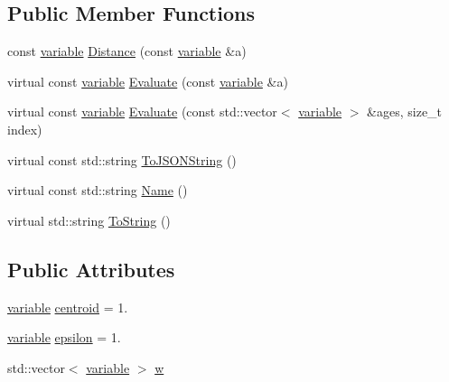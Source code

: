 \subsection*{Public Member Functions}
\begin{DoxyCompactItemize}
\item 
const \hyperlink{structmas_1_1_inverse_quadratic_r_b_f_aa73b147b14646342ba3141b53752cb1b}{variable} \hyperlink{structmas_1_1_inverse_quadratic_r_b_f_a56cc3b331603a6e1df6b861d827bed79}{Distance} (const \hyperlink{structmas_1_1_inverse_quadratic_r_b_f_aa73b147b14646342ba3141b53752cb1b}{variable} \&a)
\item 
virtual const \hyperlink{structmas_1_1_inverse_quadratic_r_b_f_aa73b147b14646342ba3141b53752cb1b}{variable} \hyperlink{structmas_1_1_inverse_quadratic_r_b_f_a4753edb34b33f783ae2c645cc16a607c}{Evaluate} (const \hyperlink{structmas_1_1_inverse_quadratic_r_b_f_aa73b147b14646342ba3141b53752cb1b}{variable} \&a)
\item 
virtual const \hyperlink{structmas_1_1_inverse_quadratic_r_b_f_aa73b147b14646342ba3141b53752cb1b}{variable} \hyperlink{structmas_1_1_inverse_quadratic_r_b_f_a326a1c19949fa3b309fbfc38a4c85dc7}{Evaluate} (const std\-::vector$<$ \hyperlink{structmas_1_1_inverse_quadratic_r_b_f_aa73b147b14646342ba3141b53752cb1b}{variable} $>$ \&ages, size\-\_\-t index)
\item 
virtual const std\-::string \hyperlink{structmas_1_1_inverse_quadratic_r_b_f_a59195ed8bba6ab30d34fa1d204c264bf}{To\-J\-S\-O\-N\-String} ()
\item 
virtual const std\-::string \hyperlink{structmas_1_1_inverse_quadratic_r_b_f_a2733866b50a4a7ae667f50334fdccc27}{Name} ()
\item 
virtual std\-::string \hyperlink{structmas_1_1_inverse_quadratic_r_b_f_a51999c40500b4bedc5bb24a1b0b87bb7}{To\-String} ()
\end{DoxyCompactItemize}
\subsection*{Public Attributes}
\begin{DoxyCompactItemize}
\item 
\hyperlink{structmas_1_1_inverse_quadratic_r_b_f_aa73b147b14646342ba3141b53752cb1b}{variable} \hyperlink{structmas_1_1_inverse_quadratic_r_b_f_a38cd5584cc6b9204720c0d8263095984}{centroid} = 1.
\item 
\hyperlink{structmas_1_1_inverse_quadratic_r_b_f_aa73b147b14646342ba3141b53752cb1b}{variable} \hyperlink{structmas_1_1_inverse_quadratic_r_b_f_af694b194e549a0883ba192dec7bd9923}{epsilon} = 1.
\item 
std\-::vector$<$ \hyperlink{structmas_1_1_inverse_quadratic_r_b_f_aa73b147b14646342ba3141b53752cb1b}{variable} $>$ \hyperlink{structmas_1_1_inverse_quadratic_r_b_f_a1e927c1c6b714eb3ca9e6deece81e60e}{w}
\end{DoxyCompactItemize}


